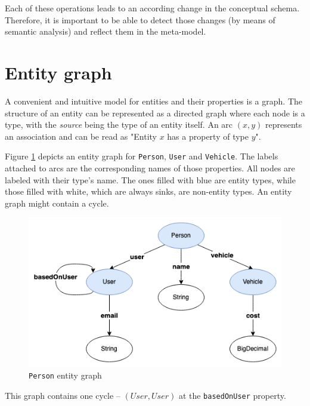 Each of these operations leads to an according change in the conceptual schema. Therefore, it is important to be able to detect those changes (by means of semantic analysis) and reflect them in the meta-model.

\section{Entity graph}
A convenient and intuitive model for entities and their properties is a graph.
The structure of an entity can be represented as a directed graph where each node is a type, with the \textit{source} being the type of an entity itself.
An arc $(x, y)$ represents an association and can be read as "Entity $x$ has a property of type $y$". 

\n

Figure \ref{fig:entity-graph} depicts an entity graph for \texttt{Person}, \texttt{User} and \texttt{Vehicle}.
The labels attached to arcs are the corresponding names of those properties.
All nodes are labeled with their type’s name.
The ones filled with blue are entity types, while those filled with white, which are always sinks, are non-entity types.
An entity graph might contain a cycle.

\begin{figure}[H]\centering
    \includegraphics[scale=0.65]{images/entity-graph.drawio.png}
    \caption{\texttt{Person} entity graph}\label{fig:entity-graph}
\end{figure}

This graph contains one cycle -- $(User, User)$ at the \texttt{basedOnUser} property.

